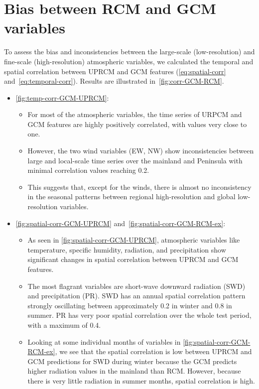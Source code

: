 \documentclass[a4paper,11pt,oneside]{report}
\begin{document}
\section{Bias between RCM and GCM variables}\label{sec:res-bias-RCM-GCM}
To assess the bias and inconsistencies between the large-scale (low-resolution) and fine-scale (high-resolution) atmospheric variables, we calculated the temporal and spatial correlation between UPRCM and GCM features (\autoref{eq:spatial-corr} and~\ref{eq:temporal-corr}). Results are illustrated in~\autoref{fig:corr-GCM-RCM}. 
\begin{itemize}
    \item \autoref{fig:temp-corr-GCM-UPRCM}: 
    \begin{itemize}
        \item For most of the atmospheric variables, the time series of URPCM and GCM features are highly positively correlated, with values very close to one.
        \item However, the two wind variables (EW, NW) show inconsistencies between large and local-scale time series over the mainland and Peninsula with minimal correlation values reaching 0.2.
        \item This suggests that, except for the winds, there is almost no inconsistency in the seasonal patterns between regional high-resolution and global low-resolution variables. 
    \end{itemize}
    \item \autoref{fig:spatial-corr-GCM-UPRCM} and~\ref{fig:spatial-corr-GCM-RCM-ex}: 
    \begin{itemize}
        \item As seen in \autoref{fig:spatial-corr-GCM-UPRCM}, atmospheric variables like temperature, specific humidity, radiation, and precipitation show significant changes in spatial correlation between UPRCM and GCM features.
        \item The most flagrant variables are short-wave downward radiation (SWD) and precipitation (PR). SWD has an annual spatial correlation pattern strongly oscillating between approximately 0.2 in winter and 0.8 in summer. PR has very poor spatial correlation over the whole test period, with a maximum of 0.4.
        \item Looking at some individual months of variables in \autoref{fig:spatial-corr-GCM-RCM-ex}, we see that the spatial correlation is low between UPRCM and GCM predictions for SWD during winter because the GCM predicts higher radiation values in the mainland than RCM. However, because there is very little radiation in summer months, spatial correlation is high. 

\end{itemize}
\end{itemize}
\end{document}
